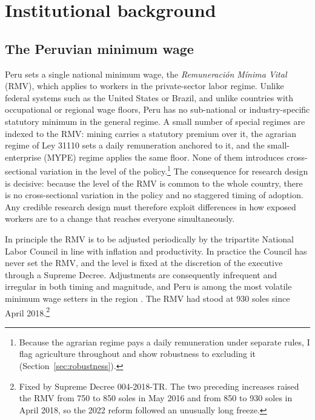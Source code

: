 \section{Institutional background}\label{sec:institutional}

\subsection{The Peruvian minimum wage}

Peru sets a single national minimum wage, the \emph{Remuneración Mínima Vital}
(RMV), which applies to workers in the private-sector labor regime. Unlike federal
systems such as the United States or Brazil, and unlike countries with occupational
or regional wage floors, Peru has no sub-national or industry-specific statutory
minimum in the general regime. A small number of special regimes are indexed to the
RMV: mining carries a statutory premium over it, the agrarian regime of Ley 31110 sets
a daily remuneration anchored to it, and the small-enterprise (MYPE) regime applies the
same floor. None of them introduces cross-sectional variation in the level of the
policy.\footnote{Because the agrarian regime pays a daily remuneration under separate
rules, I flag agriculture throughout and show robustness to excluding it
(Section~\ref{sec:robustness}).} The consequence for
research design is decisive: because the level of the RMV is common to the whole
country, there is no cross-sectional variation in the policy and no staggered timing
of adoption. Any credible research design must therefore exploit differences in how
exposed workers are to a change that reaches everyone simultaneously.

In principle the RMV is to be adjusted periodically by the tripartite National Labor
Council in line with inflation and productivity. In practice the Council has never
set the RMV, and the level is fixed at the discretion of the executive through a
Supreme Decree. Adjustments are consequently infrequent and irregular in both timing
and magnitude, and Peru is among the most volatile minimum wage setters in the
region \citep{jimenez_2023, cespedes_2005}. The RMV had stood at 930 soles since
April 2018.\footnote{Fixed by Supreme Decree 004-2018-TR. The two preceding increases raised
the RMV from 750 to 850 soles in May 2016 and from 850 to 930 soles in April 2018, so the
2022 reform followed an unusually long freeze.}

